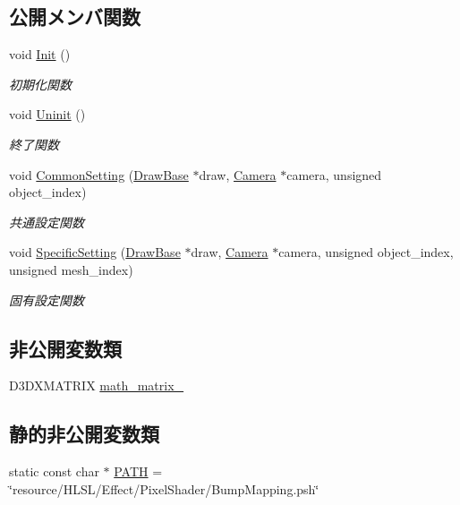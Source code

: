 \subsection*{公開メンバ関数}
\begin{DoxyCompactItemize}
\item 
void \mbox{\hyperlink{class_pixel_shader_bump_mapping_ab7807b7c56242e965ddb23e66e1a5d9e}{Init}} ()
\begin{DoxyCompactList}\small\item\em 初期化関数 \end{DoxyCompactList}\item 
void \mbox{\hyperlink{class_pixel_shader_bump_mapping_a004f731db6dab6b59949baed4a5a32d7}{Uninit}} ()
\begin{DoxyCompactList}\small\item\em 終了関数 \end{DoxyCompactList}\item 
void \mbox{\hyperlink{class_pixel_shader_bump_mapping_af62a2b40930533a3bae17319f876705d}{Common\+Setting}} (\mbox{\hyperlink{class_draw_base}{Draw\+Base}} $\ast$draw, \mbox{\hyperlink{class_camera}{Camera}} $\ast$camera, unsigned object\+\_\+index)
\begin{DoxyCompactList}\small\item\em 共通設定関数 \end{DoxyCompactList}\item 
void \mbox{\hyperlink{class_pixel_shader_bump_mapping_afa80c2404b490a444d54cc47c681ca8f}{Specific\+Setting}} (\mbox{\hyperlink{class_draw_base}{Draw\+Base}} $\ast$draw, \mbox{\hyperlink{class_camera}{Camera}} $\ast$camera, unsigned object\+\_\+index, unsigned mesh\+\_\+index)
\begin{DoxyCompactList}\small\item\em 固有設定関数 \end{DoxyCompactList}\end{DoxyCompactItemize}
\subsection*{非公開変数類}
\begin{DoxyCompactItemize}
\item 
D3\+D\+X\+M\+A\+T\+R\+IX \mbox{\hyperlink{class_pixel_shader_bump_mapping_a3c24357ac9611761eece892054847c83}{math\+\_\+matrix\+\_\+}}
\end{DoxyCompactItemize}
\subsection*{静的非公開変数類}
\begin{DoxyCompactItemize}
\item 
static const char $\ast$ \mbox{\hyperlink{class_pixel_shader_bump_mapping_a62c06006cdfad9bc6158b5d779aa732c}{P\+A\+TH}} = \char`\"{}resource/H\+L\+SL/Effect/Pixel\+Shader/Bump\+Mapping.\+psh\char`\"{}
\end{DoxyCompactItemize}


